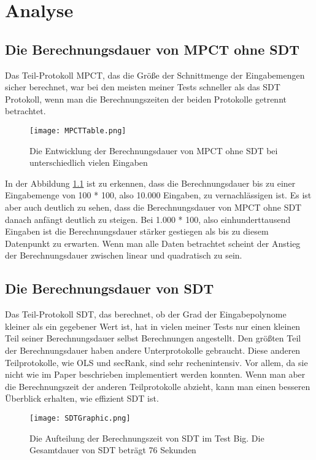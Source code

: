 
\chapter{Analyse}


\section{Die Berechnungsdauer von MPCT ohne SDT}
Das Teil-Protokoll MPCT, das die Größe der Schnittmenge der Eingabemengen sicher berechnet, war bei den meisten meiner Tests schneller als das SDT Protokoll, wenn man die Berechnungszeiten der beiden Protokolle getrennt betrachtet.\\
\begin{figure}[H]
\begin{center}
\texttt{[image: MPCTTable.png]}
\caption{Die Entwicklung der Berechnungsdauer von MPCT ohne SDT bei unterschiedlich vielen Eingaben}
\label{MPCTGraphic}
\end{center}

\end{figure}
In der Abbildung \ref{MPCTGraphic} ist zu erkennen, dass die Berechnungsdauer bis zu einer Eingabemenge von 100 * 100, also 10.000 Eingaben, zu vernachlässigen ist. Es ist aber auch deutlich zu sehen, dass die Berechnungsdauer von MPCT ohne SDT danach anfängt deutlich zu steigen. Bei 1.000 * 100, also einhunderttausend Eingaben ist die Berechnungsdauer stärker gestiegen als bis zu diesem Datenpunkt zu erwarten. Wenn man alle Daten betrachtet scheint der Anstieg der Berechnungsdauer zwischen linear und quadratisch zu sein.

\section{Die Berechnungsdauer von SDT}
Das Teil-Protokoll SDT, das berechnet, ob der Grad der Eingabepolynome kleiner als ein gegebener Wert ist, hat in vielen meiner Tests nur einen kleinen Teil seiner Berechnungsdauer selbst Berechnungen angestellt. Den größten Teil der Berechnungsdauer haben andere Unterprotokolle gebraucht. Diese anderen Teilprotokolle, wie OLS und secRank, sind sehr rechenintensiv. Vor allem, da sie nicht wie im Paper beschrieben implementiert werden konnten. Wenn man aber die Berechnungszeit der anderen Teilprotokolle abzieht, kann man einen besseren Überblick erhalten, wie effizient SDT ist.

\begin{figure}[H]
\begin{center}
\texttt{[image: SDTGraphic.png]}
\caption{Die Aufteilung der Berechnungszeit von SDT im Test Big. Die Gesamtdauer von SDT beträgt 76 Sekunden}
\label{SDTGraphic}
\end{center}
\end{figure}

